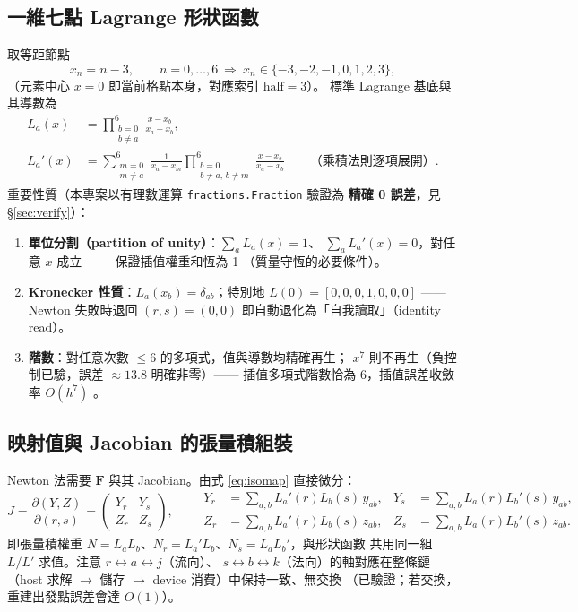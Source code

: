 \documentclass[11pt,a4paper]{article}
\newcommand{\code}[1]{\texttt{#1}}
\begin{document}
\subsection{一維七點 Lagrange 形狀函數}
\label{sec:shape}
取等距節點
\begin{equation}
x_n = n-3,\qquad n=0,\dots,6\ \Longrightarrow\ x_n\in\{-3,-2,-1,0,1,2,3\},
\end{equation}
（元素中心 $x=0$ 即當前格點本身，對應索引 $\mathrm{half}=3$）。
標準 Lagrange 基底與其導數為
\begin{align}
L_a(x) &= \prod_{\substack{b=0\\ b\neq a}}^{6}\frac{x-x_b}{x_a-x_b},
\label{eq:lagrange}\\
L_a'(x) &= \sum_{\substack{m=0\\ m\neq a}}^{6}\frac{1}{x_a-x_m}
\prod_{\substack{b=0\\ b\neq a,\,b\neq m}}^{6}\frac{x-x_b}{x_a-x_b}
\qquad\text{（乘積法則逐項展開）}.
\label{eq:dlagrange}
\end{align}
重要性質（本專案以有理數運算 \code{fractions.Fraction} 驗證為
\textbf{精確 0 誤差}，見 \S\ref{sec:verify}）：
\begin{enumerate}[itemsep=1pt]
\item \textbf{單位分割（partition of unity）}：$\sum_a L_a(x)=1$、
      $\sum_a L_a'(x)=0$，對任意 $x$ 成立 —— 保證插值權重和恆為 1
      （質量守恆的必要條件）。
\item \textbf{Kronecker 性質}：$L_a(x_b)=\delta_{ab}$；特別地
      $L(0)=[0,0,0,1,0,0,0]$ —— Newton 失敗時退回 $(r,s)=(0,0)$
      即自動退化為「自我讀取」（identity read）。
\item \textbf{階數}：對任意次數 $\le 6$ 的多項式，值與導數均精確再生；
      $x^7$ 則不再生（負控制已驗，誤差 $\approx 13.8$ 明確非零）——
      插值多項式階數恰為 6，插值誤差收斂率 $O(h^7)$
      \cite{BerrutTrefethen2004}。
\end{enumerate}

\subsection{映射值與 Jacobian 的張量積組裝}
\label{sec:jacobian}
Newton 法需要 $\bm{F}$ 與其 Jacobian。由式 \eqref{eq:isomap} 直接微分：
\begin{equation}
J=\frac{\partial(Y,Z)}{\partial(r,s)}=
\begin{pmatrix} Y_r & Y_s\\ Z_r & Z_s \end{pmatrix},\qquad
\begin{aligned}
Y_r&=\textstyle\sum_{a,b}L_a'(r)L_b(s)\,y_{ab}, &
Y_s&=\textstyle\sum_{a,b}L_a(r)L_b'(s)\,y_{ab},\\
Z_r&=\textstyle\sum_{a,b}L_a'(r)L_b(s)\,z_{ab}, &
Z_s&=\textstyle\sum_{a,b}L_a(r)L_b'(s)\,z_{ab}.
\end{aligned}
\label{eq:J}
\end{equation}
即張量積權重 $N=L_aL_b$、$N_r=L_a'L_b$、$N_s=L_aL_b'$，與形狀函數
共用同一組 $L/L'$ 求值。注意 $r\leftrightarrow a\leftrightarrow j$（流向）、
$s\leftrightarrow b\leftrightarrow k$（法向）的軸對應在整條鏈
（host 求解 $\to$ 儲存 $\to$ device 消費）中保持一致、無交換
（已驗證；若交換，重建出發點誤差會達 $O(1)$）。
\end{document}

